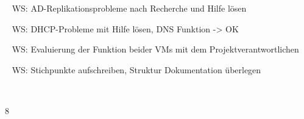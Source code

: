 {{	\textbullet~ WS: AD-Replikationsprobleme nach Recherche und Hilfe lösen\par
	\textbullet~ WS: DHCP-Probleme mit Hilfe lösen, DNS Funktion -> OK\par
	\textbullet~ WS: Evaluierung der Funktion beider VMs mit dem Projektverantwortlichen\par
	\textbullet~ WS: Stichpunkte aufschreiben, Struktur Dokumentation überlegen\par
	\textbullet~ 
	}{}{8}
}{}
\Unterschrift
\newpage
